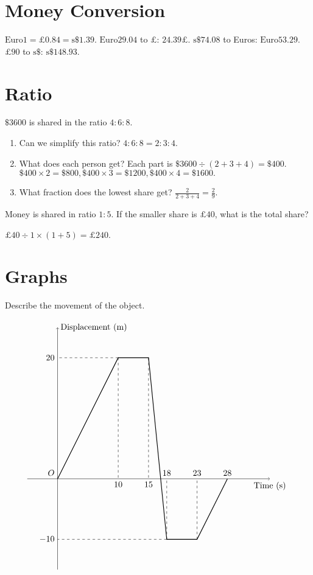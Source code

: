 \documentclass[8pt]{article}
\author{\Author}
\title{\Title}
\date{\Date}
\begin{document}
	\maketitle

	\tableofcontents

	\section{Money Conversion}

		\exmp {} \(\mathrm{Euro} 1 = \pounds 0.84 = \mathrm{s}\$1.39\). \(\mathrm{Euro} 29.04\) to \(\pounds\): \(24.39 \pounds\). \(\mathrm{s}\$ 74.08\) to Euros: \(\mathrm{Euro} 53.29\). \(\pounds 90\) to \(\mathrm{s}\$\): \(\mathrm{s}\$148.93\).

	\section{Ratio}

		\exmp {} \(\$3600\) is shared in the ratio \(4:6:8\).

		\begin{enumerate}[label=\exmpword{(\arabic*)}]
			\item Can we simplify this ratio? \(4:6:8=2:3:4\).
			\item What does each person get? Each part is \(\$3600 \div (2+3+4) = \$400\). \(\$400 \times 2 = \$800, \$400 \times 3 = \$1200, \$400 \times 4 = \$1600.\)
			\item What fraction does the lowest share get? \(\frac{2}{2+3+4} = \frac{2}{9}\).
		\end{enumerate}

		\prob Money is shared in ratio \(1:5\). If the smaller share is \(\pounds 40\), what is the total share?

		\solution \(\pounds 40 \div 1 \times (1 + 5) = \pounds 240\).

	\section{Graphs}

		\exmp {} Describe the movement of the object.

		\[
			\begin{tikzpicture}[scale = 0.25]
				\draw [black, thick] (0, 0)--(10, 20)--(15, 20)--(18, -10)--(23, -10)--(28, 0);
				\draw [black, ->] (-5, 0)--(35, 0) node[below] {Time \((\unit{\second})\)};
				\draw [black, ->] (0, -15)--(0, 25) node[right] {Displacement \((\unit{\metre})\)};
				\draw [black, dashed] (10, 20)--(0, 20) node [left] {\(20\)};
				\draw [black, dashed] (18, -10)--(0, -10) node [left] {\(-10\)};
				\draw [black, dashed] (10, 20)--(10, 0) node [below] {\(10\)};
				\draw [black, dashed] (15, 20)--(15, 0) node [below] {\(15\)};
				\draw [black, dashed] (18, -10)--(18, 0) node [above] {\(18\)};
				\draw [black, dashed] (23, -10)--(23, 0) node [above] {\(23\)};
				\node at (28, 0) [above] {\(28\)};
				\node at (0, 0) [anchor = south east] {\(O\)};
			\end{tikzpicture}
		\]
\end{document}
